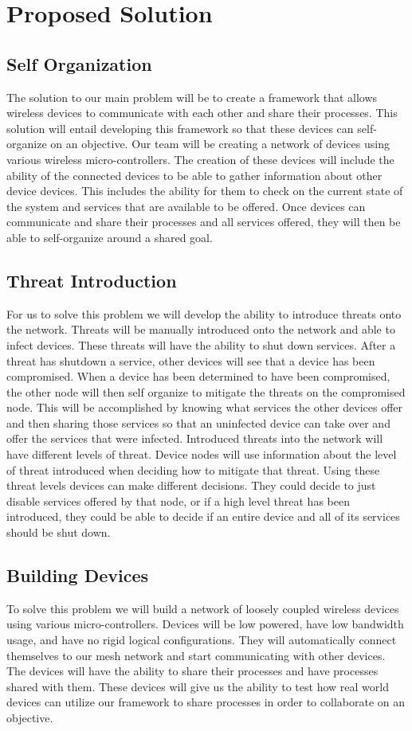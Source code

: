 \documentclass[onecolumn, draftclsnofoot,10pt, compsoc]{IEEEtran}
\begin{document}
\vspace{0.0 in}
\section{Proposed Solution}
\subsection{Self Organization}
The solution to our main problem will be to create a framework that allows wireless devices to communicate with each other and share their processes. This solution will entail developing this framework so that these devices can self-organize on an objective. Our team will be creating a network of devices using various wireless micro-controllers. The creation of these devices will include the ability of the connected devices to be able to gather information about other device devices. This includes the ability for them to check on the current state of the system and services that are available to be offered. Once devices can communicate and share their processes and all services offered, they will then be able to self-organize around a shared goal.
\subsection{Threat Introduction}
For us to solve this problem we will develop the ability to introduce threats onto the network. Threats will be manually introduced onto the network and able to infect devices. These threats will have the ability to shut down services. After a threat has shutdown a service, other devices will see that a device has been compromised. When a device has been determined to have been compromised, the other node will then self organize to mitigate the threats on the compromised node. This will be accomplished by knowing what services the other devices offer and then sharing those services so that an uninfected device can take over and offer the services that were infected. Introduced threats into the network will have different levels of threat. Device nodes will use information about the level of threat introduced when deciding how to mitigate that threat. Using these threat levels devices can make different decisions. They could decide to just disable services offered by that node, or if a high level threat has been introduced, they could be able to decide if an entire device and all of its services should be shut down.
\subsection{Building Devices}
To solve this problem we will build a network of loosely coupled wireless devices using various micro-controllers. Devices will be low powered, have low bandwidth usage, and have no rigid logical configurations. They will automatically connect themselves to our mesh network and start communicating with other devices. The devices will have the ability to share their processes and have processes shared with them. These devices will give us the ability to test how real world devices can utilize our framework to share processes in order to collaborate on an objective. 
\end{document}
